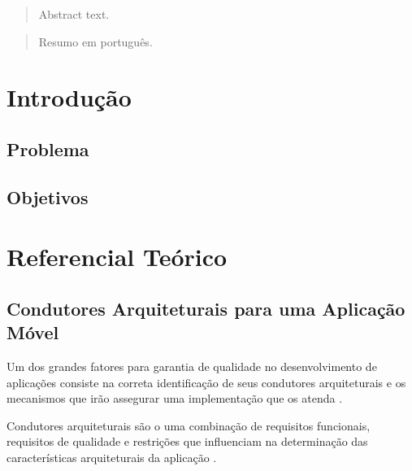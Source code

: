 \documentclass[
	article,			%
	11pt,				%
	oneside,			%
	a4paper,			%
	english,			%
	brazil,				%
	sumario=tradicional
]{abntex2}
\begin{document}
\maketitle

\begin{abstract}
Abstract text.
\end{abstract}


\begin{abstract}
Resumo em português.
\end{abstract}

\tableofcontents

\chapter{Introdução}
\section{Problema}
\section{Objetivos}
\chapter{Referencial Teórico}
\section{Condutores Arquiteturais para uma Aplicação Móvel}
Um dos grandes fatores para garantia de qualidade no desenvolvimento de aplicações consiste na correta identificação de seus condutores arquiteturais e os mecanismos que irão assegurar uma implementação que os atenda \cite{bachmann2001introduction}.

Condutores arquiteturais são o uma combinação de requisitos funcionais, requisitos de qualidade e restrições que influenciam na determinação das características arquiteturais da aplicação \cite{bachmann2001introduction}.
\end{document}
